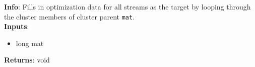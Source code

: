 \textbf{Info}: Fills in optimization data for all streams as the target by
looping through the cluster members of cluster parent \texttt{mat}.\\

\noindent \textbf{Inputs}:
\begin{itemize}
\item{long mat}
\end{itemize}

\noindent \textbf{Returns}: void
